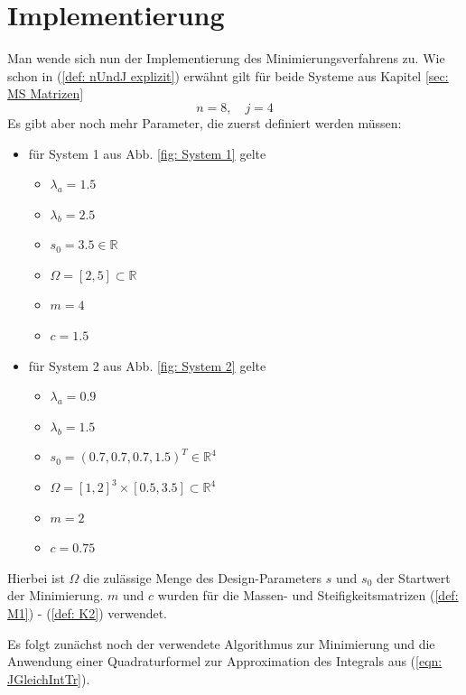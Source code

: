 \documentclass[a4paper,12pt]{report}
\newcommand{\R}{\mathbb R}
\newcommand{\1}{\mathds{1}}
\theoremstyle{plain} %
\theoremstyle{definition} %
\theoremstyle{remark}
\begin{document}
\chapter{Implementierung}
\label{sec: Programmieren}

      Man wende sich nun der Implementierung des Minimierungsverfahrens zu.
      Wie schon in (\ref{def: nUndJ explizit}) erwähnt gilt für beide Systeme aus Kapitel \ref{sec: MS Matrizen}
      $$n=8,\quad j=4$$
      Es gibt aber noch mehr Parameter, die zuerst definiert werden müssen:
      \begin{itemize}
            \item für System 1 aus Abb. \ref{fig: System 1} gelte
            \begin{itemize}
                  \item $\lambda_a = 1.5$
                  \item $\lambda_b = 2.5$
                  \item $s_0 = 3.5\in\R$
                  \item $\Omega = [2,5]\subset \R$
                  \item $m = 4$
                  \item $c = 1.5$
            \end{itemize}
            \item für System 2 aus Abb. \ref{fig: System 2} gelte
            \begin{itemize}
                  \item $\lambda_a = 0.9$
                  \item $\lambda_b = 1.5$
                  \item $s_0 = (0.7, 0.7, 0.7, 1.5)^T\in \R^4$
                  \item $\Omega = [1,2]^3\times [0.5,3.5]\subset \R^4$
                  \item $m = 2$
                  \item $c = 0.75$
            \end{itemize}
      \end{itemize}

      Hierbei ist $\Omega$ die zulässige Menge des Design-Parameters $s$ und $s_0$ der Startwert der Minimierung.
      $m$ und $c$ wurden für die Massen- und Steifigkeitsmatrizen (\ref{def: M1}) - (\ref{def: K2}) verwendet.


      Es folgt zunächst noch der verwendete Algorithmus zur Minimierung und die Anwendung einer Quadraturformel
      zur Approximation des Integrals aus (\ref{eqn: JGleichIntTr}).
\end{document}
